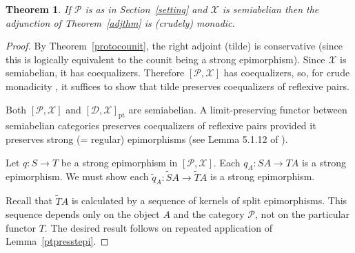 \documentclass[a4paper,12pt,reqno]{amsart}
\newtheorem{theorem}{Theorem}[section] %
\theoremstyle{definition}
\theoremstyle{fact}
\theoremstyle{genquest}
\theoremstyle{step}
\newcommand{\ra}{\rightarrow}
\def\CD{{\mathscr D}}
\def\CP{{\mathscr P}}
\def\CX{{\mathscr X}}
\begin{document}
\begin{theorem}
If $\CP$ is as in Section~\ref{setting} and $\CX$ is semiabelian then the adjunction
of Theorem~\ref{adjthm} is (crudely) monadic.
\end{theorem}
 \begin{proof}
 By Theorem~\ref{protocounit}, the right adjoint (tilde) is conservative (since this is 
 logically equivalent to the counit being a strong epimorphism).
 Since $\CX$ is semiabelian, it has coequalizers. 
 Therefore $[\CP,\CX]$ has coequalizers, so, for crude monadicity \cite{CWM}, 
 it suffices to show that tilde preserves coequalizers of reflexive pairs.
 
 Both $[\CP,\CX]$ and $[\CD,\CX]_{\mathrm{pt}}$ are semiabelian.
 A limit-preserving functor between semiabelian categories preserves coequalizers of
 reflexive pairs provided it preserves strong (= regular) epimorphisms 
 (see Lemma 5.1.12 of \cite{BorBou04}).
 
 Let $q:S\ra T$ be a strong epimorphism in $[\CP,\CX]$.
 Each $q_A:SA\ra TA$ is a strong epimorphism.
 We must show each $\widetilde{q}_A:\widetilde{S}A\ra \widetilde{T}A$ is a strong epimorphism.
 
 Recall that $\widetilde{T}A$ is calculated by a sequence of kernels of split epimorphisms.
 This sequence depends only on the object $A$ and the category $\CP$, not on the
 particular functor $T$. 
 The desired result follows on repeated application of Lemma~\ref{ptpresstepi}.   
  \end{proof}
\end{document}
